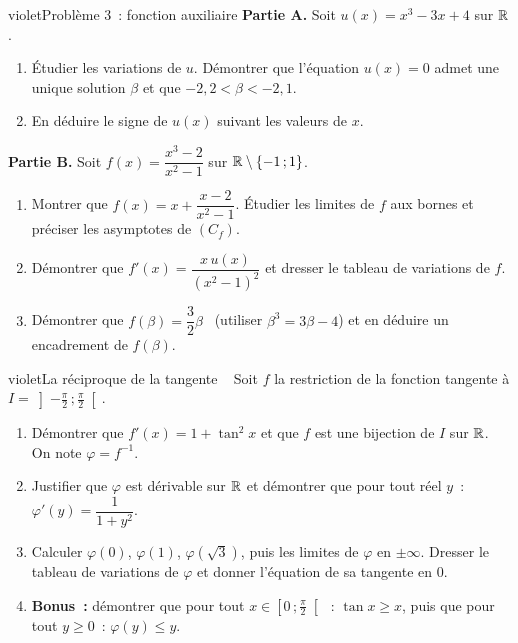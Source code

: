 \begin{exo}{violet}{Problème 3~: fonction auxiliaire }
\textbf{Partie A.} Soit $u(x)=x^3-3x+4$ sur $\mathbb{R}$.
\begin{enumerate}
  \item Étudier les variations de $u$. Démontrer que l'équation $u(x)=0$ admet une unique solution $\beta$ et que $-2{,}2<\beta<-2{,}1$.
  \item En déduire le signe de $u(x)$ suivant les valeurs de $x$.
\end{enumerate}
\textbf{Partie B.} Soit $f(x)=\dfrac{x^3-2}{x^2-1}$ sur $\mathbb{R}\setminus\{-1\,;1\}$.
\begin{enumerate}
  \item Montrer que $f(x)=x+\dfrac{x-2}{x^2-1}$. Étudier les limites de $f$ aux bornes et préciser les asymptotes de $(C_f)$.
  \item Démontrer que $f'(x)=\dfrac{x\,u(x)}{(x^2-1)^2}$ et dresser le tableau de variations de $f$.
  \item Démontrer que $f(\beta)=\dfrac32\beta$ \ (utiliser $\beta^3=3\beta-4$) et en déduire un encadrement de $f(\beta)$.
\end{enumerate}
\end{exo}

\begin{exo}{violet}{La réciproque de la tangente \demo\ }
Soit $f$ la restriction de la fonction tangente à $I=\left]-\frac\pi2\,;\frac\pi2\right[$.
\begin{enumerate}
  \item Démontrer que $f'(x)=1+\tan^2x$ et que $f$ est une bijection de $I$ sur $\mathbb{R}$. On note $\varphi=f^{-1}$.
  \item Justifier que $\varphi$ est dérivable sur $\mathbb{R}$ et démontrer que pour tout réel $y$~: \ $\varphi'(y)=\dfrac{1}{1+y^2}$.
  \item Calculer $\varphi(0)$, $\varphi(1)$, $\varphi\left(\sqrt3\right)$, puis les limites de $\varphi$ en $\pm\infty$. Dresser le tableau de variations de $\varphi$ et donner l'équation de sa tangente en $0$.
  \item \textbf{Bonus~:} démontrer que pour tout $x\in\left[0\,;\frac\pi2\right[$~: $\tan x\geq x$, puis que pour tout $y\geq0$~: $\varphi(y)\leq y$.
\end{enumerate}
\end{exo}

